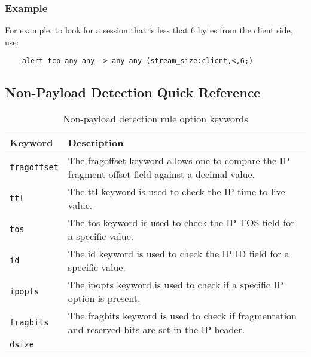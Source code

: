 \documentclass[english]{report}
\begin{document}
\subsubsection{Example}

For example, to look for a session that is less that 6 bytes from the client
side, use:

\begin{verbatim}
    alert tcp any any -> any any (stream_size:client,<,6;)
\end{verbatim}

\subsection{Non-Payload Detection Quick Reference}
\begin{center}
\begin{longtable}[h]{| p{1in} | p{4.5in} |}
\caption{Non-payload detection rule option keywords} \\

\hline
Keyword & Description \\
\hline

\hline
\texttt{fragoffset} &

The fragoffset keyword allows one to compare the IP fragment offset field
against a decimal value. \\

\hline
\texttt{ttl} &

The ttl keyword is used to check the IP time-to-live value. \\

\hline
\texttt{tos} &

The tos keyword is used to check the IP TOS field for a specific value. \\

\hline
\texttt{id} &

The id keyword is used to check the IP ID field for a specific value. \\

\hline
\texttt{ipopts} &

The ipopts keyword is used to check if a specific IP option is present. \\

\hline
\texttt{fragbits} &

The fragbits keyword is used to check if fragmentation and reserved bits are
set in the IP header. \\

\hline
\texttt{dsize} &


\end{longtable}
\end{center}
\end{document}
